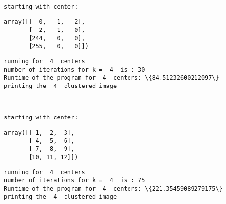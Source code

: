 \documentclass[11pt]{article}
\begin{document}
    \begin{center}
    \end{center}
    { \hspace*{\fill} \\}
    
    \begin{Verbatim}[commandchars=\\\{\}]
starting with center:
    \end{Verbatim}

    
    \begin{verbatim}
array([[  0,   1,   2],
       [  2,   1,   0],
       [244,   0,   0],
       [255,   0,   0]])
    \end{verbatim}

    
    \begin{Verbatim}[commandchars=\\\{\}]
running for  4  centers
number of iterations for k =  4  is : 30
Runtime of the program for  4  centers: \{84.51232600212097\}
printing the  4  clustered image
    \end{Verbatim}

    \begin{center}
    \end{center}
    { \hspace*{\fill} \\}
    
    \begin{Verbatim}[commandchars=\\\{\}]
starting with center:
    \end{Verbatim}

    
    \begin{verbatim}
array([[ 1,  2,  3],
       [ 4,  5,  6],
       [ 7,  8,  9],
       [10, 11, 12]])
    \end{verbatim}

    
    \begin{Verbatim}[commandchars=\\\{\}]
running for  4  centers
number of iterations for k =  4  is : 75
Runtime of the program for  4  centers: \{221.35459089279175\}
printing the  4  clustered image
    \end{Verbatim}

    \begin{center}
    \end{center}
    { \hspace*{\fill} \\}
    

    
    
    
\end{document}
